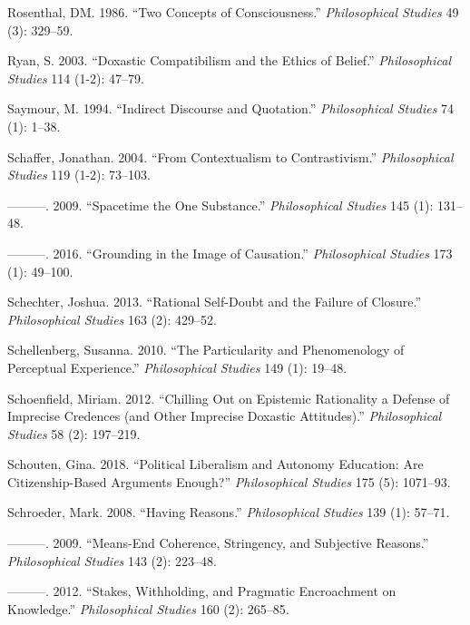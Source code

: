 \documentclass[
  10pt,
  letterpaper,
  DIV=11,
  numbers=noendperiod,
  twoside]{scrartcl}
\newlength{\cslhangindent}
\newenvironment{CSLReferences}[2] %
 {\begin{list}{}{%
  \setlength{\itemindent}{0pt}
  \setlength{\leftmargin}{0pt}
  \setlength{\parsep}{0pt}
  \ifodd #1
   \setlength{\leftmargin}{\cslhangindent}
   \setlength{\itemindent}{-1\cslhangindent}
  \fi
  \setlength{\itemsep}{#2\baselineskip}}}
 {\end{list}}
\begin{document}
\begin{CSLReferences}{1}{0}
Rosenthal, DM. 1986. {``Two Concepts of Consciousness.''}
\emph{Philosophical Studies} 49 (3): 329--59.

Ryan, S. 2003. {``Doxastic Compatibilism and the Ethics of Belief.''}
\emph{Philosophical Studies} 114 (1-2): 47--79.

Saymour, M. 1994. {``Indirect Discourse and Quotation.''}
\emph{Philosophical Studies} 74 (1): 1--38.

Schaffer, Jonathan. 2004. {``From Contextualism to Contrastivism.''}
\emph{Philosophical Studies} 119 (1-2): 73--103.

---------. 2009. {``Spacetime the One Substance.''} \emph{Philosophical
Studies} 145 (1): 131--48.

---------. 2016. {``Grounding in the Image of Causation.''}
\emph{Philosophical Studies} 173 (1): 49--100.

Schechter, Joshua. 2013. {``Rational Self-Doubt and the Failure of
Closure.''} \emph{Philosophical Studies} 163 (2): 429--52.

Schellenberg, Susanna. 2010. {``The Particularity and Phenomenology of
Perceptual Experience.''} \emph{Philosophical Studies} 149 (1): 19--48.

Schoenfield, Miriam. 2012. {``Chilling Out on Epistemic Rationality a
Defense of Imprecise Credences (and Other Imprecise Doxastic
Attitudes).''} \emph{Philosophical Studies} 58 (2): 197--219.

Schouten, Gina. 2018. {``Political Liberalism and Autonomy Education:
Are Citizenship-Based Arguments Enough?''} \emph{Philosophical Studies}
175 (5): 1071--93.

Schroeder, Mark. 2008. {``Having Reasons.''} \emph{Philosophical
Studies} 139 (1): 57--71.

---------. 2009. {``Means-End Coherence, Stringency, and Subjective
Reasons.''} \emph{Philosophical Studies} 143 (2): 223--48.

---------. 2012. {``Stakes, Withholding, and Pragmatic Encroachment on
Knowledge.''} \emph{Philosophical Studies} 160 (2): 265--85.


\end{CSLReferences}
\end{document}

